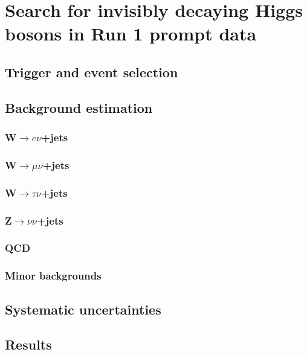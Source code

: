 \chapter{Search for invisibly decaying Higgs bosons in Run 1 prompt data}
\label{chap:prompt}

\section{Trigger and event selection}%
\label{sec:promptsel}

\section{Background estimation}%
\label{sec:promptbkg}

\subsection{W$\rightarrow e\nu$+jets}%
\label{sec:promptwenu}

\subsection{W$\rightarrow \mu\nu$+jets}%
\label{sec:promptwmunu}

\subsection{W$\rightarrow \tau\nu$+jets}%
\label{sec:promptwtaunu}

\subsection{Z$\rightarrow \nu\nu$+jets}%
\label{sec:promptznunu}

\subsection{QCD}%
\label{sec:promptQCD}

\subsection{Minor backgrounds}%
\label{sec:promptminor}

\section{Systematic uncertainties}%
\label{sec:promptsyst}

\section{Results}%
\label{sec:promptresults}
